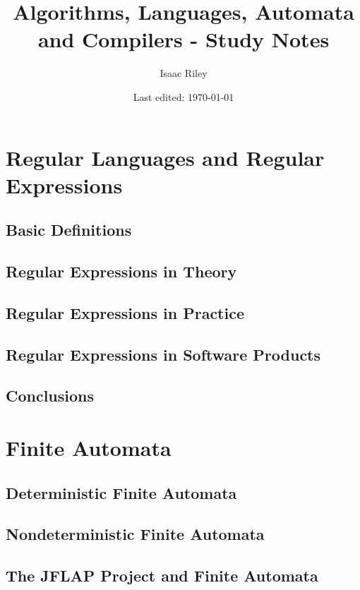 \documentclass[a4paper]{article}
\title{Algorithms, Languages, Automata and Compilers - Study Notes}
\author{Isaac Riley}
\date{Last edited: \today}
\begin{document}
\maketitle
\tableofcontents
\newpage







\section{Regular Languages and Regular Expressions}
\subsection{Basic Definitions}
\subsection{Regular Expressions in Theory}
\subsection{Regular Expressions in Practice}
\subsection{Regular Expressions in Software Products}
\subsection{Conclusions}

\newpage
\section{Finite Automata}
\subsection{Deterministic Finite Automata}
\subsection{Nondeterministic Finite Automata}
\subsection{The JFLAP Project and Finite Automata}
\end{document}

